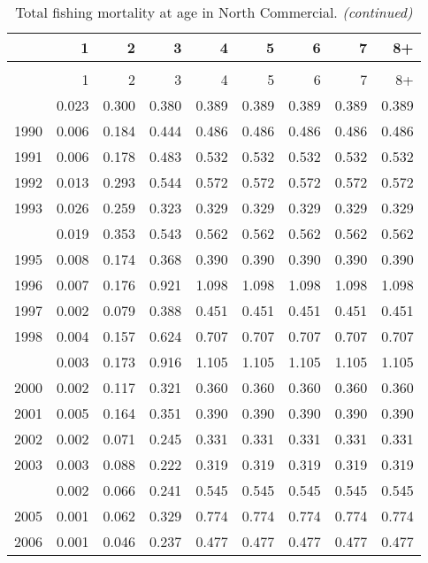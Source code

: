 \documentclass[
]{article}
\begin{document}
\begin{longtable}[t]{lrrrrrrrr}
\caption{\label{tab:North_Commercial-fleet-FAA-table}Total fishing mortality at age in North Commercial.}\\
\toprule
  & 1 & 2 & 3 & 4 & 5 & 6 & 7 & 8+\\
\midrule
\endfirsthead
\caption[]{Total fishing mortality at age in North Commercial. \textit{(continued)}}\\
\toprule
  & 1 & 2 & 3 & 4 & 5 & 6 & 7 & 8+\\
\midrule
\endhead

\endfoot
\bottomrule
\endlastfoot
1989 & 0.023 & 0.300 & 0.380 & 0.389 & 0.389 & 0.389 & 0.389 & 0.389\\
1990 & 0.006 & 0.184 & 0.444 & 0.486 & 0.486 & 0.486 & 0.486 & 0.486\\
1991 & 0.006 & 0.178 & 0.483 & 0.532 & 0.532 & 0.532 & 0.532 & 0.532\\
1992 & 0.013 & 0.293 & 0.544 & 0.572 & 0.572 & 0.572 & 0.572 & 0.572\\
1993 & 0.026 & 0.259 & 0.323 & 0.329 & 0.329 & 0.329 & 0.329 & 0.329\\
\addlinespace
1994 & 0.019 & 0.353 & 0.543 & 0.562 & 0.562 & 0.562 & 0.562 & 0.562\\
1995 & 0.008 & 0.174 & 0.368 & 0.390 & 0.390 & 0.390 & 0.390 & 0.390\\
1996 & 0.007 & 0.176 & 0.921 & 1.098 & 1.098 & 1.098 & 1.098 & 1.098\\
1997 & 0.002 & 0.079 & 0.388 & 0.451 & 0.451 & 0.451 & 0.451 & 0.451\\
1998 & 0.004 & 0.157 & 0.624 & 0.707 & 0.707 & 0.707 & 0.707 & 0.707\\
\addlinespace
1999 & 0.003 & 0.173 & 0.916 & 1.105 & 1.105 & 1.105 & 1.105 & 1.105\\
2000 & 0.002 & 0.117 & 0.321 & 0.360 & 0.360 & 0.360 & 0.360 & 0.360\\
2001 & 0.005 & 0.164 & 0.351 & 0.390 & 0.390 & 0.390 & 0.390 & 0.390\\
2002 & 0.002 & 0.071 & 0.245 & 0.331 & 0.331 & 0.331 & 0.331 & 0.331\\
2003 & 0.003 & 0.088 & 0.222 & 0.319 & 0.319 & 0.319 & 0.319 & 0.319\\
\addlinespace
2004 & 0.002 & 0.066 & 0.241 & 0.545 & 0.545 & 0.545 & 0.545 & 0.545\\
2005 & 0.001 & 0.062 & 0.329 & 0.774 & 0.774 & 0.774 & 0.774 & 0.774\\
2006 & 0.001 & 0.046 & 0.237 & 0.477 & 0.477 & 0.477 & 0.477 & 0.477\\

\end{longtable}
\end{document}
